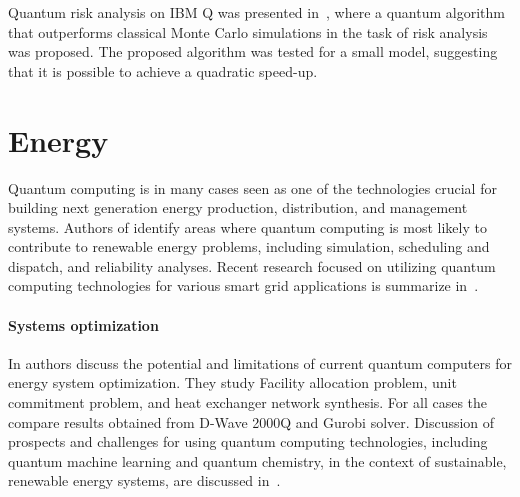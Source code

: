 \documentclass[a4paper,11pt]{article}
\begin{document}
Quantum risk analysis on IBM Q was presented in~\cite{woerner2019quantum}, where a quantum algorithm that outperforms classical Monte Carlo simulations in the task of risk analysis was proposed.  The proposed algorithm was
tested for a small model, suggesting that it is possible to achieve a quadratic speed-up.


\section{Energy}

Quantum computing is in many cases seen as one of the technologies crucial for building next generation energy production, distribution, and management systems. Authors of \cite{giani2021quantum} identify areas where quantum computing is most likely to contribute to renewable energy problems, including simulation, scheduling and dispatch, and reliability analyses. Recent research focused on utilizing quantum computing technologies for various smart grid applications is summarize in~\cite{ullah2022quantum}.


\paragraph{Systems optimization}

In \cite{ajagekar2019quantum} authors discuss the potential and limitations of current quantum computers for energy system optimization. They study 
Facility allocation problem, unit commitment problem, and heat exchanger network synthesis. For all cases the compare results obtained from D-Wave 2000Q and Gurobi solver.
Discussion of prospects and challenges for using quantum computing technologies, including quantum machine learning and quantum chemistry, in the context of sustainable, renewable energy systems, are discussed in~\cite{ajagekar2022quantum}.
\end{document}
